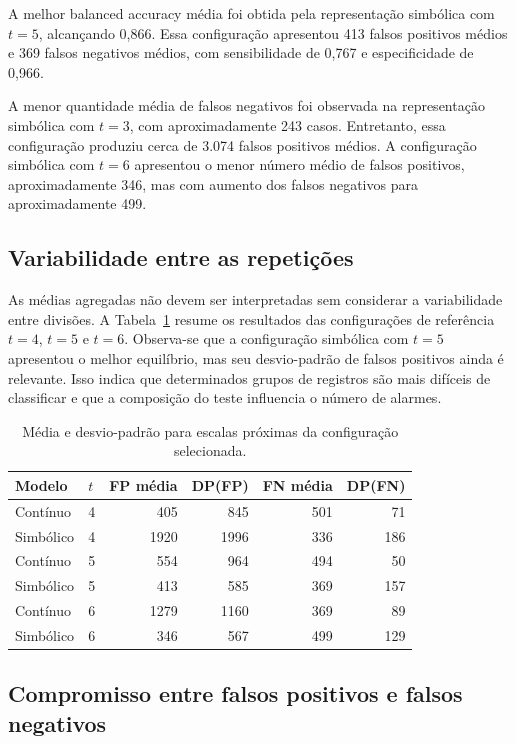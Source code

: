 \documentclass[12pt,a4paper]{article}
\begin{document}
A melhor balanced accuracy média foi obtida pela representação simbólica com $t=5$, alcançando 0,866. Essa configuração apresentou 413 falsos positivos médios e 369 falsos negativos médios, com sensibilidade de 0,767 e especificidade de 0,966.

A menor quantidade média de falsos negativos foi observada na representação simbólica com $t=3$, com aproximadamente 243 casos. Entretanto, essa configuração produziu cerca de 3.074 falsos positivos médios. A configuração simbólica com $t=6$ apresentou o menor número médio de falsos positivos, aproximadamente 346, mas com aumento dos falsos negativos para aproximadamente 499.

\subsection{Variabilidade entre as repetições}

As médias agregadas não devem ser interpretadas sem considerar a variabilidade entre divisões. A Tabela~\ref{tab:variabilidade} resume os resultados das configurações de referência $t=4$, $t=5$ e $t=6$. Observa-se que a configuração simbólica com $t=5$ apresentou o melhor equilíbrio, mas seu desvio-padrão de falsos positivos ainda é relevante. Isso indica que determinados grupos de registros são mais difíceis de classificar e que a composição do teste influencia o número de alarmes.

\begin{table}[H]
\centering
\caption{Média e desvio-padrão para escalas próximas da configuração selecionada.}
\label{tab:variabilidade}
\small
\begin{tabular}{llrrrr}
\toprule
Modelo & $t$ & FP média & DP(FP) & FN média & DP(FN) \\
\midrule
Contínuo & 4 & 405 & 845 & 501 & 71 \\
Simbólico & 4 & 1920 & 1996 & 336 & 186 \\
Contínuo & 5 & 554 & 964 & 494 & 50 \\
Simbólico & 5 & 413 & 585 & 369 & 157 \\
Contínuo & 6 & 1279 & 1160 & 369 & 89 \\
Simbólico & 6 & 346 & 567 & 499 & 129 \\
\bottomrule
\end{tabular}
\end{table}

\subsection{Compromisso entre falsos positivos e falsos negativos}
\end{document}
